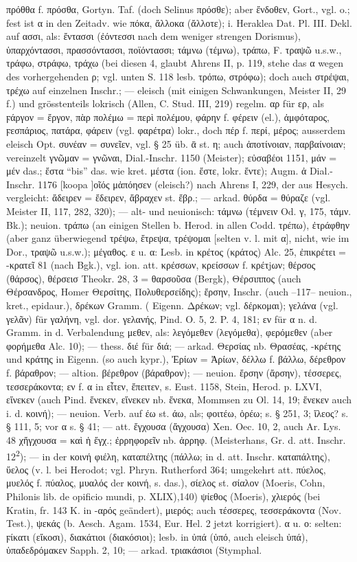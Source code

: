πρόθθα f. πρόσθα, Gortyn. Taf. (doch Selinus πρόσθε); aber ἔνδοθεν, Gort., vgl. o.; fest ist α in den Zeitadv. wie πόκα, ἄλλοκα (ἄλλοτε); i. Heraklea Dat. Pl. III. Dekl. auf ασσι, als: ἔντασσι (ἐόντεσσι nach dem weniger strengen Dorismus), ὑπαρχόντασσι, πρασσόντασσι, ποϊόντασσι; τάμνω (τέμνω), τράπω, F. τραψῶ u.s.w., τράφω, στράφω, τράχω (bei diesen 4, glaubt Ahrens II, p. 119, stehe das α wegen des vorhergehenden ρ; vgl. unten S. 118 lesb. τρόπω, στρόφω); doch auch στρέψαι, τρέχω auf einzelnen Inschr.; — eleisch (mit einigen Schwankungen, Meister II, 29 f.) und grösstenteils lokrisch (Allen, C. Stud. III, 219) regelm. αρ für ερ, als ϝάργον = ἔργον, πὰρ πολέμω = περὶ πολέμου, φάρην f. φέρειν (el.), ἀμφόταρος, ϝεσπάριος, πατάρα, φάρειν (vgl. φαρέτρα) lokr., doch πέρ f. περί, μέρος; ausserdem eleisch Opt. συνέαν = συνεῖεν, vgl. § 25 üb. ᾱ st. η; auch ἀποτίνοιαν, παρβαίνοιαν; vereinzelt γνῶμαν = γνῶναι, Dial.-Inschr. 1150 (Meister); εὐσαβέοι 1151, μάν = μέν das.; ἔστα “bis” das. wie kret. μέστα (ion. ἔστε, lokr. ἔντε); Augm. ἀ Dial.-Inschr. 1176 [koopa ]οῖός μἀπόησεν (eleisch?) nach Ahrens I, 229, der aus Hesych. vergleicht: ἄδειρεν = ἔδειρεν, ἄβραχεν st. ἔβρ.; — arkad. θύρδα = θύραζε (vgl. Meister II, 117, 282, 320); — alt- und neuionisch: τάμνω (τέμνειν Od. γ, 175, τάμν. Bk.); neuion. τράπω (an einigen Stellen b. Herod. in allen Codd. τρέπω), ἐτράφθην (aber ganz überwiegend τρέψω, ἔτρεψα, τρέψομαι [selten v. l. mit α], nicht, wie im Dor., τραψῶ u.s.w.); μέγαθος. ε u. α: Lesb. in κρέτος (κράτος) Alc. 25, ἐπικρέτει = -κρατεῖ 81 (nach Bgk.), vgl. ion. att. κρέσσων, κρείσσων f. κρέτjων; θέρσος (θάρσος), θέρσεισ Theokr. 28, 3 = θαρσοῦσα (Bergk), Θέρσιππος (auch  Θέρσανδρος, Homer Θερσίτης, Πολυθερσείδης); ἔρσην, Inschr. (auch --117-- neuion., kret., epidaur.), δρέκων Gramm. ( Eigenn. Δρέκων; vgl. δέρκομαι); γελάνα (vgl. γελᾶν) für γαλήνη, vgl. dor. γελανής, Pind. O. 5, 2. P. 4, 181; εν für α n. d. Gramm. in d. Verbalendung μεθεν, als: λεγόμεθεν (λεγόμεθα), φερόμεθεν (aber φορήμεθα Alc. 10); — thess. διέ für διά; — arkad. Θερσίας nb. Θρασέας, -κρέτης und κράτης in Eigenn. (so auch kypr.), Ἐρίων = Ἀρίων, δέλλω f. βάλλω, δέρεθρον f. βάραθρον; — altion. βέρεθρον (βάραθρον); — neuion. ἔρσην (ἄρσην), τέσσερες, τεσσεράκοντα; εν f. α in εἶτεν, ἔπειτεν, s. Eust. 1158, Stein, Herod. p. LXVI, εἵνεκεν (auch Pind. ἕνεκεν, εἵνεκεν nb. ἕνεκα, Mommsen zu Ol. 14, 19; ἕνεκεν auch i. d. κοινή); — neuion. Verb. auf έω st. άω, als; φοιτέω, ὁρέω; s. § 251, 3; ἵλεος? s. § 111, 5; vor α s. § 41; — att. ἔγχουσα (ἄγχουσα) Xen. Oec. 10, 2, auch Ar. Lys. 48 χἤγχουσα = καὶ ἡ ἔγχ.; ἐρρηφορεῖν nb. ἀρρηφ. (Meisterhans, Gr. d. att. Inschr. 12\textsuperscript{2}); — in der κοινή φιέλη, καταπέλτης (πάλλω; in d. att. Inschr. καταπάλτης), ὕελος (v. l. bei Herodot; vgl. Phryn. Rutherford 364; umgekehrt att. πύελος, μυελός f. πύαλος, μυαλός der κοινή, s. das.), σίελος st. σίαλον (Moeris, Cohn, Philonis lib. de opificio mundi, p. XLIX),140) ψίεθος (Moeris), χλιερός (bei Kratin, fr. 143 K. in -αρός geändert), μιερός; auch τέσσερες, τεσσεράκοντα (Nov. Test.), ψεκάς (b. Aesch. Agam. 1534, Eur. Hel. 2 jetzt korrigiert). α u. ο:  selten: ϝίκατι (εἴκοσι), διακάτιοι (διακόσιοι); lesb. in ὐπά (ὑπό, auch eleisch ὐπά), ὑπαδεδρόμακεν Sapph. 2, 10; — arkad. τριακάσιοι (Stymphal. 
